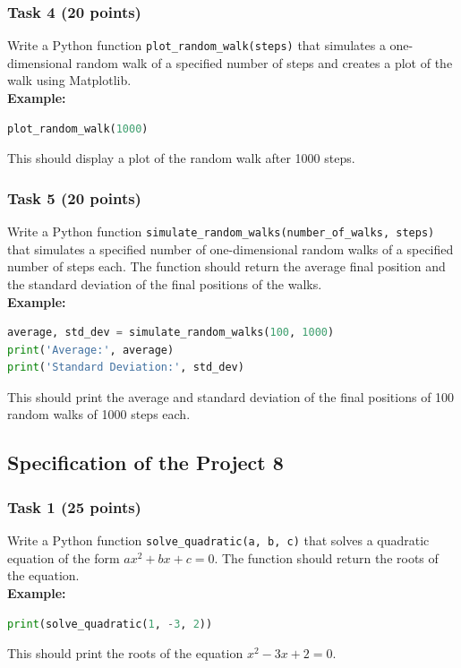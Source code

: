 \documentclass[12pt]{article}
\begin{document}
\subsubsection{Task 4 (20 points)}
Write a Python function \texttt{plot\_random\_walk(steps)} that simulates a one-dimensional random walk of a specified number of steps and creates a plot of the walk using Matplotlib. \\
\textbf{Example:}
\begin{lstlisting}[language=Python]
plot_random_walk(1000)
\end{lstlisting}
This should display a plot of the random walk after 1000 steps.

\subsubsection{Task 5 (20 points)}
Write a Python function \texttt{simulate\_random\_walks(number\_of\_walks, steps)} that simulates a specified number of one-dimensional random walks of a specified number of steps each. The function should return the average final position and the standard deviation of the final positions of the walks. \\
\textbf{Example:}
\begin{lstlisting}[language=Python]
average, std_dev = simulate_random_walks(100, 1000)
print('Average:', average)
print('Standard Deviation:', std_dev)
\end{lstlisting}
This should print the average and standard deviation of the final positions of 100 random walks of 1000 steps each.
\newpage
\subsection{Specification of the Project 8}

\subsubsection{Task 1 (25 points)}
Write a Python function \texttt{solve\_quadratic(a, b, c)} that solves a quadratic equation of the form $ax^2 + bx + c = 0$. The function should return the roots of the equation. \\
\textbf{Example:}
\begin{lstlisting}[language=Python]
print(solve_quadratic(1, -3, 2))
\end{lstlisting}
This should print the roots of the equation $x^2 - 3x + 2 = 0$.
\end{document}
